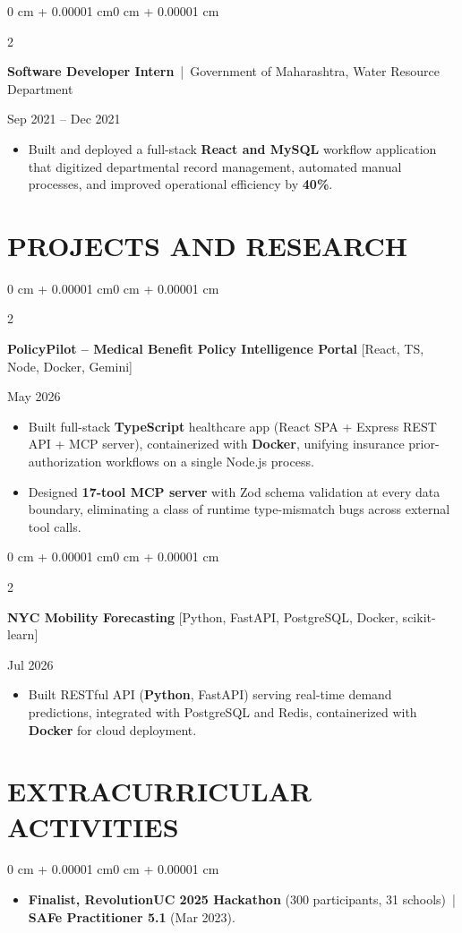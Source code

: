 \documentclass[10pt, letterpaper]{article}
\newenvironment{highlights}{
    \begin{itemize}[
        topsep=0.10 cm,
        parsep=0.06 cm,
        partopsep=0pt,
        itemsep=0.06 cm,
        leftmargin=12pt
    ]
}{
    \end{itemize}
}
\newenvironment{onecolentry}{
    \begin{adjustwidth}{0 cm + 0.00001 cm}{0 cm + 0.00001 cm}
}{
    \end{adjustwidth}
}
\newenvironment{twocolentry}[2][]{
    \onecolentry
    \def\secondColumn{#2}
    \setcolumnwidth{\fill, 4.5 cm}
    \begin{paracol}{2}
}{
    \switchcolumn \raggedleft \secondColumn
    \end{paracol}
    \endonecolentry
}
\begin{document}
\vspace{0.15 cm}

\begin{twocolentry}{Sep 2021 -- Dec 2021}
\textbf{Software Developer Intern} \,|\, Government of Maharashtra, Water Resource Department
\end{twocolentry}
\begin{highlights}
  \item Built and deployed a full-stack \textbf{React and MySQL} workflow application that digitized departmental record management, automated manual processes, and improved operational efficiency by \textbf{40\%}.
\end{highlights}

\section{PROJECTS AND RESEARCH}
\begin{twocolentry}{May 2026}
\textbf{PolicyPilot -- Medical Benefit Policy Intelligence Portal} [React, TS, Node, Docker, Gemini]
\end{twocolentry}
\begin{highlights}
  \item Built full-stack \textbf{TypeScript} healthcare app (React SPA + Express REST API + MCP server), containerized with \textbf{Docker}, unifying insurance prior-authorization workflows on a single Node.js process.
  \item Designed \textbf{17-tool MCP server} with Zod schema validation at every data boundary, eliminating a class of runtime type-mismatch bugs across external tool calls.
\end{highlights}

\vspace{0.12 cm}

\begin{twocolentry}{Jul 2026}
\textbf{NYC Mobility Forecasting} [Python, FastAPI, PostgreSQL, Docker, scikit-learn]
\end{twocolentry}
\begin{highlights}
  \item Built RESTful API (\textbf{Python}, FastAPI) serving real-time demand predictions, integrated with PostgreSQL and Redis, containerized with \textbf{Docker} for cloud deployment.
\end{highlights}

\section{EXTRACURRICULAR ACTIVITIES}
\begin{onecolentry}
\begin{highlights}
  \item \textbf{Finalist, RevolutionUC 2025 Hackathon} (300 participants, 31 schools) \,|\, \textbf{SAFe Practitioner 5.1} (Mar 2023).
\end{highlights}
\end{onecolentry}
\end{document}
